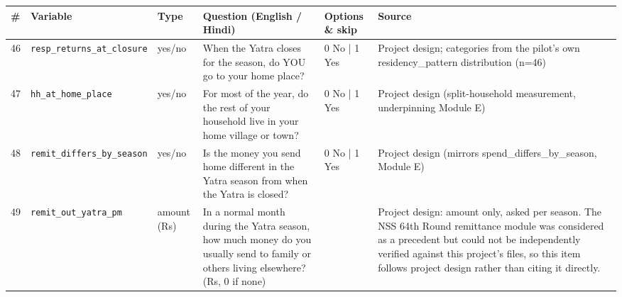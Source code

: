 \documentclass[9pt,a4paper,landscape]{article}
\begin{document}
\begin{longtable}{@{}p{0.5cm}p{3.3cm}p{1.7cm}p{7.3cm}p{5.6cm}p{5.4cm}@{}}
\toprule \footnotesize\textbf{\#} & \footnotesize\textbf{Variable} & \footnotesize\textbf{Type} & \footnotesize\textbf{Question (English / Hindi)} & \footnotesize\textbf{Options {\&} skip} & \footnotesize\textbf{Source}\\ \midrule
\endhead
\footnotesize 46 & \footnotesize\texttt{resp\_returns\_at\_closure} & \scriptsize yes/no & \footnotesize When the Yatra closes for the season, do YOU go to your home place?\par\vspace{1pt}{\footnotesize\color{hdr}{\hifont जब यात्रा का मौसम ख़त्म हो जाता है, तो क्या आप अपने घर चले जाते हैं?}} & \scriptsize 0 No | 1 Yes & \scriptsize Project design; categories from the pilot's own residency\_pattern distribution (n=46)\\
\footnotesize 47 & \footnotesize\texttt{hh\_at\_home\_place} & \scriptsize yes/no & \footnotesize For most of the year, do the rest of your household live in your home village or town?\par\vspace{1pt}{\footnotesize\color{hdr}{\hifont साल के ज़्यादातर समय, क्या आपके घर के बाक़ी लोग आपके गाँव या शहर में ही रहते हैं?}} & \scriptsize 0 No | 1 Yes & \scriptsize Project design (split-household measurement, underpinning Module E)\\
\footnotesize 48 & \footnotesize\texttt{remit\_differs\_by\_season} & \scriptsize yes/no & \footnotesize Is the money you send home different in the Yatra season from when the Yatra is closed?\par\vspace{1pt}{\footnotesize\color{hdr}{\hifont यात्रा के सीज़न में आप घर जो पैसा भेजते हैं, वह यात्रा बंद रहने के महीनों से अलग होता है?}} & \scriptsize 0 No | 1 Yes & \scriptsize Project design (mirrors spend\_differs\_by\_season, Module E)\\
\footnotesize 49 & \footnotesize\texttt{remit\_out\_yatra\_pm} & \scriptsize amount (Rs) & \footnotesize In a normal month during the Yatra season, how much money do you usually send to family or others living elsewhere? (Rs, 0 if none)\par\vspace{1pt}{\footnotesize\color{hdr}{\hifont यात्रा के मौसम के आम महीने में, आप घर या कहीं और रहने वालों को कितना पैसा भेजते हैं? (रुपये, न भेजते हों तो 0)}} & \scriptsize  & \scriptsize Project design: amount only, asked per season. The NSS 64th Round remittance module was considered as a precedent but could not be independently verified against this project's files, so this item follows project design rather than citing it directly.\\

\end{longtable}
\end{document}

